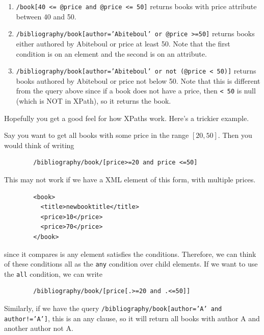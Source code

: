 \documentclass{article}
\begin{document}
\begin{example}
\begin{enumerate}
        \item \texttt{/book[40 <= @price and @price <= 50]} returns books with price attribute between 40 and 50. 

        \item \texttt{/bibliography/book[author='Abiteboul' or @price >=50]} returns books either authored by Abiteboul or price at least 50. Note that the first condition is on an element and the second is on an attribute. 

        \item \texttt{/bibliography/book[author='Abiteboul' or not (@price < 50)]} returns books authored by Abiteboul or price not below 50. Note that this is different from the query above since if a book does not have a price, then \texttt{\@price < 50} is null (which is NOT in XPath), so it returns the book. 
      \end{enumerate}
    \end{example}

    Hopefully you get a good feel for how XPaths work. Here's a trickier example. 

    \begin{example}
      Say you want to get all books with some price in the range $[20, 50]$. Then you would think of writing 
      \begin{lstlisting}
        /bibliography/book/[price>=20 and price <=50]
      \end{lstlisting}
      This may not work if we have a XML element of this form, with multiple prices. 
      \begin{lstlisting}
        <book> 
          <title>newbooktitle</title>
          <price>10</price>
          <price>70</price> 
        </book>
      \end{lstlisting} 
      since it compares is any element satisfies the conditions. Therefore, we can think of these conditions all as the \texttt{any} condition over child elements. If we want to use the \texttt{all} condition, we can write 
      \begin{lstlisting}
        /bibliography/book/[price[.>=20 and .<=50]]
      \end{lstlisting}

      Similarly, if we have the query \texttt{/bibliography/book[author='A' and author!='A']}, this is an any clause, so it will return all books with author A and another author not A. 
    \end{example}
\end{document}
